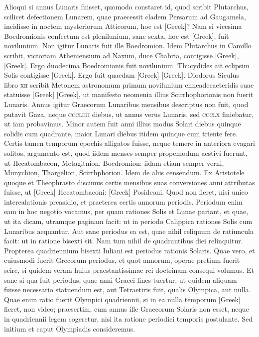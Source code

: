 Alioqui si annus Lunaris fuisset, quomodo constaret
id, quod scribit Plutarchus, scilicet defectionem Lunarem, quae
praecessit cladem Persarum ad Gaugamela, incidisse in noctem mysteriorum
Atticorum, hoc est \textgreek{[Greek]}?
Nam si vicesima Boedromionis
confectum est plenilunium, sane sexta, hoc est \textgreek{[Greek]},
fuit novilunium.
Non igitur Lunaris fuit ille Boedromion.
Idem Plutarchus
in Camillo scribit, victoriam Atheniensium ad Naxum, duce
Chabria, contigisse \textgreek{[Greek]}, \textgreek{[Greek]}.
Ergo
duodecima Boedromionis fuit novilunium.
Thucydides ait eclipsim
Solis contigisse \textgreek{[Greek]}.
Ergo fuit quaedam \textgreek{[Greek]}
\textgreek{[Greek]}.
Diodorus Siculus libro \textsc{xii} scribit Metonem astronomum
primum novilunium enneadecaeteridis suae statuisse \textgreek{[Greek]}
\textgreek{[Greek]}, ut manifesto neomenia illius Scirrhophorionis non fuerit
Lunaris.
Annus igitur Graecorum Lunaribus mensibus descriptus non
fuit, quod putavit Gaza, neque \textsc{cccliiii} diebus, ut annus verus Lunaris,
sed \textsc{ccclx} finiebatur, ut iam probavimus.
Minor autem fuit
anni illius modus Solari diebus quinque solidis cum quadrante, maior
Lunari diebus itidem quinque cum triente fere.
Certis tamen temporum
epochis alligatos fuisse, neque temere in anteriora evagari solitos,
argumento est, quod iidem menses semper propemodum aestivi
fuerunt, ut Hecatombaeon, Metagitnion, Boedromion: iidam etiam
semper verni, Munychion, Thargelion, Scirrhphorion.
Idem de aliis censendum.
Ex Aristotele quoque et Theophrasto discimus
certis mensibus suas conversiones anni attributas fuisse, ut \textgreek{[Greek]}
Hecatombaeoni: \textgreek{[Greek]} Posideoni.
Quod non fieret, nisi unico
intercalationis preasidio, et praeterea certis annorum periodis.
Periodum
enim eam in hoc negotio vocamus, per quam rationes Solis
et Lunae pariant, et quae, ut ita dicam, utramque paginam facit: ut in
periodo Calippica rationes Solis cum Lunaribus aequantur.
Aut sane
periodus ea est, quae nihil reliquum de ratiuncula facit: ut in ratione
bisexti sit.
Nam tum nihil de quadrantibus diei relinquitur.
Propterea
quadriennium bisexti Iuliani est periodus rationis Solaris.
Quae vero, et cuiusmodi fuerit Grecorum periodus, et quot annorum,
operae pretium fuerit scire, si quidem veram huius praestantissimae rei
doctrinam consequi volumus.
Et sane si qua fuit periodus, quae anni
Graeci fines tuertur, ut quidem aliquam fuisse necessario statuendum
est, aut Tetraetiris fuit, qualis Olympica, aut nulla.
Quae enim ratio
fuerit Olympici quadriennii, si in ea nulla temporum \textgreek{[Greek]} fieret,
non video;
praesertim, cum annus ille Graecorum Solaris non esset,
neque in quadriennii legem cogeretur, nisi ita ratione periodici temporis
postulante.
Sed initium et caput Olympiadis consideremus.

